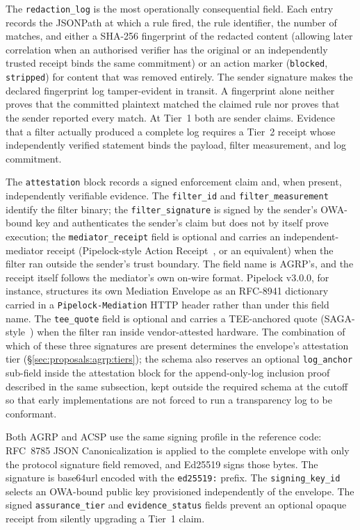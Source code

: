 The \texttt{redaction\_log} is the most operationally
consequential field. Each entry records the JSONPath at
which a rule fired, the rule identifier, the number of
matches, and either a SHA-256 fingerprint of the redacted
content (allowing later correlation when an authorised
verifier has the original or an independently trusted
receipt binds the same commitment) or an action marker
(\texttt{blocked}, \texttt{stripped}) for content that
was removed entirely. The sender signature makes the
declared fingerprint log tamper-evident in transit. A
fingerprint alone neither proves that the committed
plaintext matched the claimed rule nor proves that the
sender reported every match. At Tier~1 both are sender
claims. Evidence that a filter actually produced a
complete log requires a Tier~2 receipt whose independently
verified statement binds the payload, filter measurement,
and log commitment.

The \texttt{attestation} block records a signed
enforcement claim and, when present, independently
verifiable evidence. The \texttt{filter\_id} and
\texttt{filter\_measurement} identify the filter binary;
the \texttt{filter\_signature} is signed by the sender's
OWA-bound key and authenticates the sender's claim but does
not by itself prove execution; the \texttt{mediator\_receipt} field is
optional and carries an independent-mediator receipt
(Pipelock-style Action Receipt~\cite{pipelock}, or an
equivalent) when the filter ran outside the sender's
trust boundary. The field name is AGRP's, and the
receipt itself follows the mediator's own on-wire
format. Pipelock v3.0.0, for instance, structures its
own Mediation Envelope as an RFC-8941 dictionary
carried in a \texttt{Pipelock-Mediation} HTTP header
rather than under this field name. The
\texttt{tee\_quote} field is optional and carries a
TEE-anchored quote (SAGA-style~\cite{saga2026}) when the
filter ran inside vendor-attested hardware. The
combination of which of these three signatures are
present determines the envelope's attestation tier
(\S\ref{sec:proposals:agrp:tiers}); the schema also
reserves an optional \texttt{log\_anchor} sub-field
inside the attestation block for the append-only-log
inclusion proof described in the same subsection, kept
outside the required schema at the cutoff so that
early implementations are not forced to run a
transparency log to be conformant.

Both AGRP and ACSP use the same signing profile in the
reference code: RFC~8785 JSON Canonicalization is applied
to the complete envelope with only the protocol signature
field removed, and Ed25519 signs those bytes. The signature
is base64url encoded with the \texttt{ed25519:} prefix. The
\texttt{signing\_key\_id} selects an OWA-bound public key
provisioned independently of the envelope. The signed
\texttt{assurance\_tier} and \texttt{evidence\_status}
fields prevent an optional opaque receipt from silently
upgrading a Tier~1 claim.

